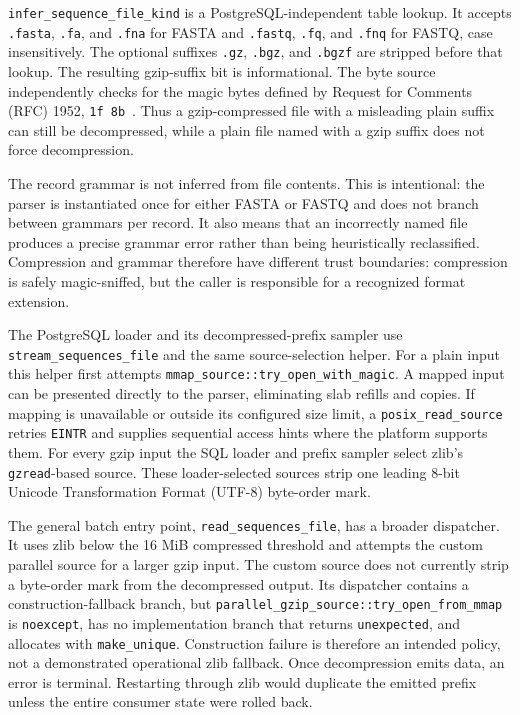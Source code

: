 \texttt{infer\_sequence\_file\_kind} is a PostgreSQL-independent table lookup.
It accepts \texttt{.fasta}, \texttt{.fa}, and \texttt{.fna} for FASTA and
\texttt{.fastq}, \texttt{.fq}, and \texttt{.fnq} for FASTQ, case
insensitively.  The optional suffixes \texttt{.gz}, \texttt{.bgz}, and
\texttt{.bgzf} are stripped before that lookup.  The resulting gzip-suffix bit
is informational. The byte source independently checks for the magic bytes
defined by Request for Comments (RFC) 1952,
\texttt{1f 8b}~\cite{rfc1952_gzip}. Thus a gzip-compressed file with a
misleading plain suffix can still be decompressed, while a plain file named
with a gzip suffix does not force decompression.

The record grammar is not inferred from file contents.  This is intentional:
the parser is instantiated once for either FASTA or FASTQ and does not branch
between grammars per record.  It also means that an incorrectly named file
produces a precise grammar error rather than being heuristically reclassified.
Compression and grammar therefore have different trust boundaries:
compression is safely magic-sniffed, but the caller is responsible for a
recognized format extension.

The PostgreSQL loader and its decompressed-prefix sampler use
\texttt{stream\_sequences\_file} and the same source-selection helper. For a
plain input this helper first attempts
\texttt{mmap\_source::\allowbreak try\_open\_\allowbreak with\_magic}. A mapped input can be presented
directly to the parser, eliminating slab refills and copies. If mapping is
unavailable or outside its configured size limit, a
\texttt{posix\_read\_source} retries \texttt{EINTR} and supplies sequential
access hints where the platform supports them. For every gzip input the SQL
loader and prefix sampler select zlib's \texttt{gzread}-based source. These
loader-selected sources strip one leading 8-bit Unicode Transformation Format
(UTF-8) byte-order mark.

The general batch entry point, \texttt{read\_sequences\_file}, has a broader
dispatcher. It uses zlib below the 16 MiB compressed threshold and attempts
the custom parallel source for a larger gzip input. The custom source does not
currently strip a byte-order mark from the decompressed output. Its dispatcher
contains a construction-fallback branch, but
\texttt{parallel\_gzip\_source::try\_open\_from\_mmap} is
\texttt{noexcept}, has no implementation branch that returns
\texttt{unexpected}, and allocates with \texttt{make\_unique}. Construction
failure is therefore an intended policy, not a demonstrated operational zlib
fallback. Once decompression emits data, an error is terminal. Restarting
through zlib would duplicate the emitted prefix unless the entire consumer
state were rolled back.

